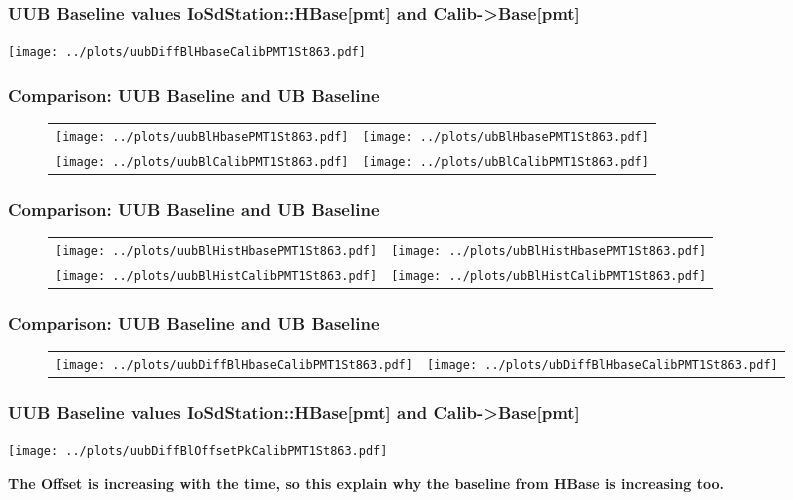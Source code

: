 \documentclass[aspectratio=169]{beamer}
\begin{document}



\begin{frame}
	\frametitle{UUB Baseline values IoSdStation::HBase[pmt] and Calib->Base[pmt]}
	\centering
	\texttt{[image: ../plots/uubDiffBlHbaseCalibPMT1St863.pdf]}
\end{frame}


\begin{frame}
	\frametitle{Comparison: UUB Baseline and UB Baseline}
	\begin{figure}
		\centering
		\begin{tabularx}{\textwidth}{CC}
			\texttt{[image: ../plots/uubBlHbasePMT1St863.pdf]}
			&
			\texttt{[image: ../plots/ubBlHbasePMT1St863.pdf]}
			\\
			\texttt{[image: ../plots/uubBlCalibPMT1St863.pdf]}
			&
			\texttt{[image: ../plots/ubBlCalibPMT1St863.pdf]}
		\end{tabularx}
	\end{figure}
\end{frame}


\begin{frame}
	\frametitle{Comparison: UUB Baseline and UB Baseline}
	\begin{figure}
		\centering
		\begin{tabularx}{\textwidth}{CC}
			\texttt{[image: ../plots/uubBlHistHbasePMT1St863.pdf]}
			&
			\texttt{[image: ../plots/ubBlHistHbasePMT1St863.pdf]}
			\\
			\texttt{[image: ../plots/uubBlHistCalibPMT1St863.pdf]}
			&
			\texttt{[image: ../plots/ubBlHistCalibPMT1St863.pdf]}
		\end{tabularx}
	\end{figure}
\end{frame}


\begin{frame}
	\frametitle{Comparison: UUB Baseline and UB Baseline}
	\begin{figure}
		\centering
		\begin{tabularx}{\textwidth}{CC}
			\texttt{[image: ../plots/uubDiffBlHbaseCalibPMT1St863.pdf]}
			&
			\texttt{[image: ../plots/ubDiffBlHbaseCalibPMT1St863.pdf]}
		\end{tabularx}
	\end{figure}
\end{frame}


\begin{frame}
	\frametitle{UUB Baseline values IoSdStation::HBase[pmt] and Calib->Base[pmt]}
	\centering
	\texttt{[image: ../plots/uubDiffBlOffsetPkCalibPMT1St863.pdf]}
	\vspace{0.2cm}

	{\bf The Offset is increasing with the time, so this explain why the baseline 
	from HBase is increasing too.}
\end{frame}
\end{document}
